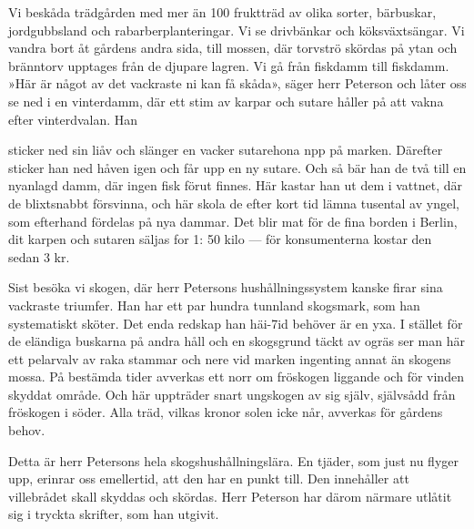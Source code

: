 Vi beskåda trädgården med mer än 100 fruktträd av olika
sorter, bärbuskar, jordgubbsland och rabarberplanteringar. Vi se
drivbänkar och köksväxtsängar. Vi vandra bort åt gårdens andra
sida, till mossen, där torvströ skördas på ytan och bränntorv
upptages från de djupare lagren. Vi gå från fiskdamm till fiskdamm.
»Här är något av det vackraste ni kan få skåda», säger herr
Peterson och låter oss se ned i en vinterdamm, där ett stim av
karpar och sutare håller på att vakna efter vinterdvalan. Han

sticker ned sin liåv och slänger en vacker sutarehona npp på
marken. Därefter sticker han ned håven igen och får upp en ny
sutare. Och så bär han de två till en nyanlagd damm, där ingen
fisk förut finnes. Här kastar han ut dem i vattnet, där de
blixtsnabbt försvinna, och här skola de efter kort tid lämna tusental
av yngel, som efterhand fördelas på nya dammar. Det blir mat
för de fina borden i Berlin, dit karpen och sutaren säljas for
1: 50 kilo — för konsumenterna kostar den sedan 3 kr.

Sist besöka vi skogen, där herr Petersons hushållningssystem
kanske firar sina vackraste triumfer. Han har ett par hundra
tunnland skogsmark, som han systematiskt sköter. Det enda
redskap han häi-7id behöver är en yxa. I stället för de eländiga
buskarna på andra håll och en skogsgrund täckt av ogräs ser
man här ett pelarvalv av raka stammar och nere vid marken
ingenting annat än skogens mossa. På bestämda tider avverkas
ett norr om fröskogen liggande och för vinden skyddat område.
Och här uppträder snart ungskogen av sig själv, självsådd från
fröskogen i söder. Alla träd, vilkas kronor solen icke når, avverkas
för gårdens behov.

Detta är herr Petersons hela skogshushållningslära. En tjäder,
som just nu flyger upp, erinrar oss emellertid, att den har en
punkt till. Den innehåller att villebrådet skall skyddas och skördas.
Herr Peterson har därom närmare utlåtit sig i tryckta skrifter,
som han utgivit.